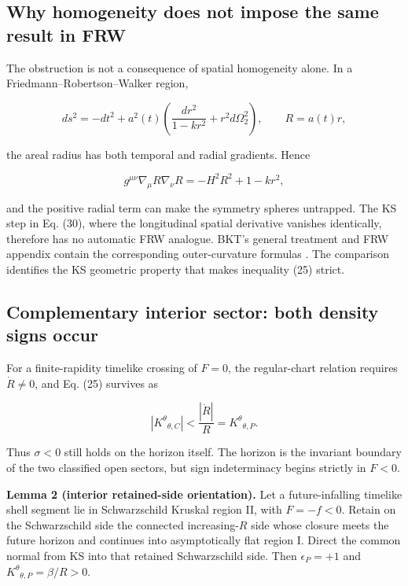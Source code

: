 \documentclass[pdflatex,sn-mathphys-num]{sn-jnl}
\begin{document}
\subsection{Why homogeneity does not impose the same result in FRW}

The obstruction is not a consequence of spatial homogeneity alone. In a Friedmann--Robertson--Walker region,


\begin{equation}
ds^2=-dt^2+a^2(t)\left(\frac{dr^2}{1-kr^2}+r^2d\Omega_2^2\right),
\qquad R=a(t)r,
\tag{34}
\end{equation}

the areal radius has both temporal and radial gradients. Hence


\begin{equation}
g^{\mu\nu}\nabla_\mu R\nabla_\nu R
=-H^2R^2+1-kr^2,
\tag{35}
\end{equation}

and the positive radial term can make the symmetry spheres untrapped. The KS step in Eq. (30), where the longitudinal spatial derivative vanishes identically, therefore has no automatic FRW analogue. BKT's general treatment and FRW appendix contain the corresponding outer-curvature formulas \cite[pp.~2942--2943, Appendix B]{ref2}. The comparison identifies the KS geometric property that makes inequality (25) strict.


\subsection{Complementary interior sector: both density signs occur}

For a finite-rapidity timelike crossing of \(F=0\), the regular-chart relation requires \(\dot R\ne0\), and Eq. (25) survives as


\[
\left|K^\theta{}_{\theta,C}\right|<\frac{|\dot R|}{R}
=K^\theta{}_{\theta,P}.
\]

Thus \(\sigma<0\) still holds on the horizon itself. The horizon is the invariant boundary of the two classified open sectors, but sign indeterminacy begins strictly in \(F<0\).


\textbf{Lemma 2 (interior retained-side orientation).} Let a future-infalling timelike shell segment lie in Schwarzschild Kruskal region II, with \(F=-f<0\). Retain on the Schwarzschild side the connected increasing-\(R\) side whose closure meets the future horizon and continues into asymptotically flat region I. Direct the common normal from KS into that retained Schwarzschild side. Then \(\epsilon_P=+1\) and \(K^\theta{}_{\theta,P}=\beta/R>0\).
\end{document}
